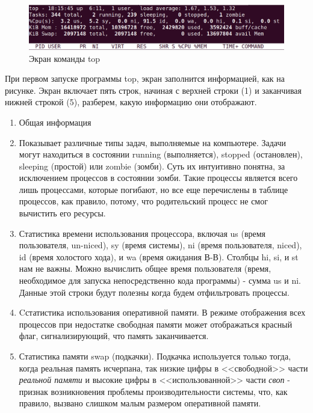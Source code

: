 \documentclass[12pt]{article}
\providecommand{\tightlist}{%
  \setlength{\itemsep}{0pt}\setlength{\parskip}{0pt}}
\begin{document}
\begin{figure}[tbh]
  \centering
  \includegraphics[width=0.9\linewidth]{blog/2019/bash-essentials/top-header.png}

  \caption{Экран команды top}
  \label{fig:topscreen}
\end{figure}
При первом запуске программы top, экран заполнится информацией, как на
рисунке. Экран включает пять строк, начиная с верхней строки (1) и
заканчивая нижней строкой (5), разберем, какую информацию они
отображают.

\begin{enumerate}
\tightlist
\item
  Общая информация
\item
  Показывает различные типы задач, выполняемые на компьютере. Задачи
  могут находиться в состоянии running (выполняется), stopped
  (остановлен), sleeping (простой) или zombie (зомби). Суть их
  интуитивно понятна, за исключением процессов в состоянии зомби. Такие
  процессы является всего лишь процессами, которые погибают, но все еще
  перечислены в таблице процессов, как правило, потому, что родительский
  процесс не смог вычистить его ресурсы.
\item
  Статистика времени использования процессора, включая us (время
  пользователя, un-niced), sy (время системы), ni (время пользователя,
  niced), id (время холостого хода), и wa (время ожидания В-В). Столбцы
  hi, si, и st нам не важны. Можно вычислить общее время пользователя
  (время, необходимое для запуска непосредственно кода программы) -
  сумма us и ni. Данные этой строки будут полезны когда будем
  отфильтровать процессы.
\item
  Cстатистика использования оперативной памяти. В режиме отображения всех
  процессов при недостатке свободная памяти может отображаться красный
  флаг, сигнализирующий, что память заканчивается.
\item
  Статистика памяти swap (подкачки). Подкачка используется только тогда,
  когда реальная память исчерпана, так низкие цифры в <<свободной>> части
  \emph{реальной памяти} и высокие цифры в <<использованной>> части
  \emph{своп} - признак возникновения проблемы производительности
  системы, что, как правило, вызвано слишком малым размером оперативной
  памяти.
\end{enumerate}
\end{document}
